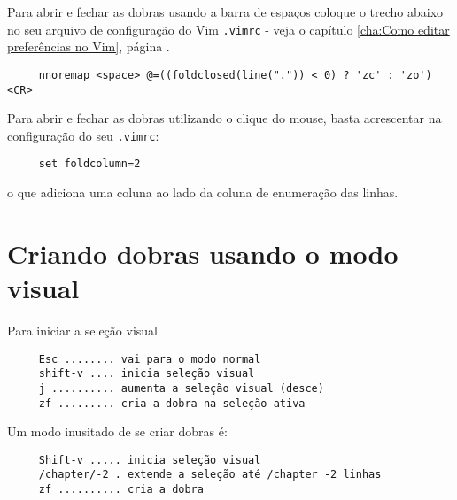 Para abrir e fechar as dobras usando a barra de
espaços coloque o trecho abaixo no seu arquivo de configuração do Vim
\verb|.vimrc| - veja o capítulo \ref{cha:Como editar preferências no Vim}, página
\pageref{cha:Como editar preferências no Vim}.

\begin{verbatim}
     nnoremap <space> @=((foldclosed(line(".")) < 0) ? 'zc' : 'zo')<CR>
\end{verbatim}

Para abrir e fechar as dobras utilizando o clique do mouse, basta
acrescentar na configuração do seu \verb|.vimrc|:

\begin{verbatim}
     set foldcolumn=2
\end{verbatim}

o que adiciona uma coluna ao lado da coluna de enumeração das linhas.

\section{Criando dobras usando o modo visual}
\label{Criando folders usando o modo visual}
Para iniciar a seleção visual

\begin{verbatim}
     Esc ........ vai para o modo normal
     shift-v .... inicia seleção visual
     j .......... aumenta a seleção visual (desce)
     zf ......... cria a dobra na seleção ativa
\end{verbatim}

Um modo inusitado de se criar dobras é:

\begin{verbatim}
     Shift-v ..... inicia seleção visual
     /chapter/-2 . extende a seleção até /chapter -2 linhas
     zf .......... cria a dobra
\end{verbatim}
